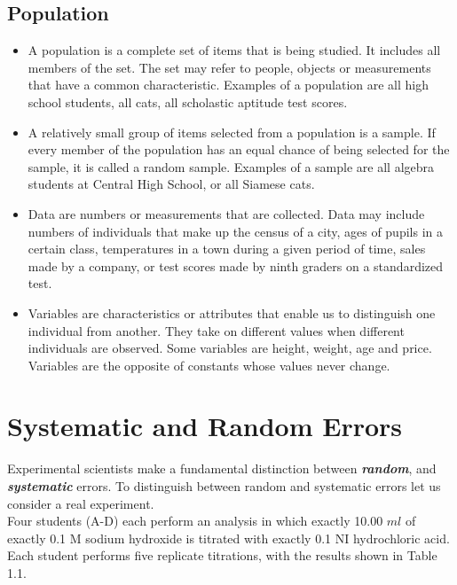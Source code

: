 ﻿\documentclass[]{report}
\begin{document}
\subsection*{Population}
\begin{itemize}
\item A population is a complete set of items that is being studied. It includes all members of the set. The set may refer to people, objects or measurements that have a common characteristic. Examples of a population are all high school students, all cats, all scholastic aptitude test scores.

\item A relatively small group of items selected from a population is a sample. If every member of the population has an equal chance of being selected for the sample, it is called a random sample. Examples of a sample are all algebra students at Central High School, or all Siamese cats.

\item Data are numbers or measurements that are collected. Data may include numbers of individuals that make up the census of a city, ages of pupils in a certain class, temperatures in a town during a given period of time, sales made by a company, or test scores made by ninth graders on a standardized test.

\item Variables are characteristics or attributes that enable us to distinguish one individual from another. They take on different values when different individuals are observed. Some variables are height, weight, age and price. Variables are the opposite of constants whose values never change.

\end{itemize}

\section{Systematic and Random Errors}
Experimental scientists make a fundamental distinction between \textbf{\emph{random}}, and
\textbf{\emph{systematic}} errors. To distinguish between random and systematic errors let
us consider a real experiment.\\

\noindent Four students (A-D) each perform an analysis in which exactly 10.00 $ml$
of exactly 0.1 M sodium hydroxide is titrated with exactly 0.1 NI
hydrochloric acid.
Each student performs five replicate titrations, with the results shown in
Table 1.1.
\end{document}
